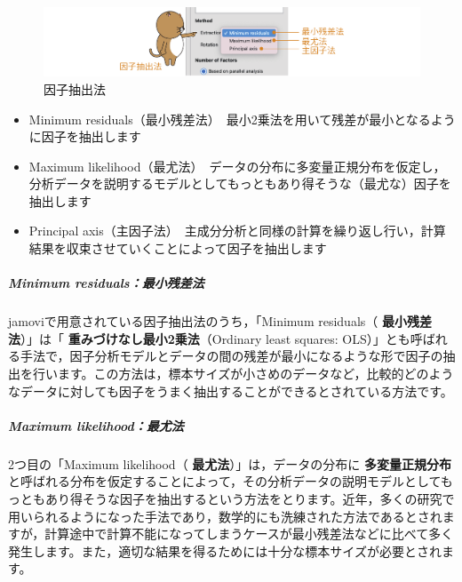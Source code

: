 \documentclass[
  12pt,
  a5jpaper,
  lualatex, ja=standard]{bxjsbook}
\providecommand{\tightlist}{%
  \setlength{\itemsep}{0pt}\setlength{\parskip}{0pt}}
\renewcommand{\emph}[1]{\textbf{\color{emph} #1}}
\newenvironment{jmvsettings}{%
	\begin{center}%
	\begin{tcolorbox}[%
		title=設定項目,
		colframe=gmoji,
		colbacktitle=gmoji,
		colback=gmoji!2!white,
		breakable,
		width=.9\textwidth,
		]\small\addtolength{\leftmargini}{-3\labelsep}%
	}%
	{\end{tcolorbox}\end{center}}
\begin{document}
\begin{figure}[!ht]

{\centering \includegraphics[width=1\linewidth]{images/factor/efa-extract} 

}

\caption{因子抽出法}\label{fig:factor-efa-extract}
\end{figure}

\begin{jmvsettings}

\begin{itemize}
\tightlist
\item
  Minimum residuals（最小残差法）　最小2乗法を用いて残差が最小となるように因子を抽出します
\item
  Maximum likelihood（最尤法）　データの分布に多変量正規分布を仮定し，分析データを説明するモデルとしてもっともあり得そうな（最尤な）因子を抽出します
\item
  Principal axis（主因子法）　主成分分析と同様の計算を繰り返し行い，計算結果を収束させていくことによって因子を抽出します
\end{itemize}

\end{jmvsettings}

\hypertarget{subsub:factor-fa-extraction-minres}{%
\subparagraph*{Minimum residuals：最小残差法}\label{subsub:factor-fa-extraction-minres}}

jamoviで用意されている因子抽出法のうち，「Minimum residuals（\emph{最小残差法}）」は「\emph{重みづけなし最小2乗法}（Ordinary least squares: OLS）」とも呼ばれる手法で，因子分析モデルとデータの間の残差が最小になるような形で因子の抽出を行います。この方法は，標本サイズが小さめのデータなど，比較的どのようなデータに対しても因子をうまく抽出することができるとされている方法です。

\hypertarget{maximum-likelihoodux6700ux5c24ux6cd5}{%
\subparagraph*{Maximum likelihood：最尤法}\label{maximum-likelihoodux6700ux5c24ux6cd5}}

2つ目の「Maximum likelihood（\emph{最尤法}）」は，データの分布に\emph{多変量正規分布}と呼ばれる分布を仮定することによって，その分析データの説明モデルとしてもっともあり得そうな因子を抽出するという方法をとります。近年，多くの研究で用いられるようになった手法であり，数学的にも洗練された方法であるとされますが，計算途中で計算不能になってしまうケースが最小残差法などに比べて多く発生します。また，適切な結果を得るためには十分な標本サイズが必要とされます。
\end{document}
